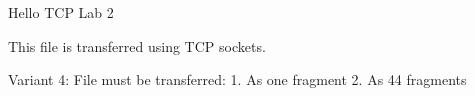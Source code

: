 \documentclass{article}
\begin{document}
Hello TCP Lab 2

This file is transferred using TCP sockets.

Variant 4:
File must be transferred:
1. As one fragment
2. As 44 fragments
\end{document}
